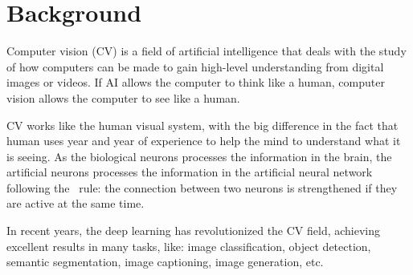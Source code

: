 \section{Background}\label{sec:background}
Computer vision (CV) is a field of artificial intelligence that deals with the study of how computers can be made to gain high-level understanding from digital images or videos.
If AI allows the computer to think like a human, computer vision allows the computer to see like a human.

CV works like the human visual system, with the big difference in the fact that human uses year and year of experience to help the mind to understand what it is seeing.
As the biological neurons processes the information in the brain, the artificial neurons processes the information in the artificial neural network following the~\cite{site:hebbian-plasticity} rule: the connection between two neurons is strengthened if they are active at the same time.

In recent years, the deep learning has revolutionized the CV field, achieving excellent results in many tasks, like: image classification, object detection, semantic segmentation, image captioning, image generation, etc.

